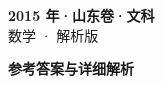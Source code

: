 \documentclass[zihao=-4, a4paper]{ctexart}
\begin{document}
\begin{center}
  {\Large\bfseries 2015 年·山东卷·文科}\\[4pt]
  {\large 数学 · 解析版}
\end{center}
\medskip
{}

\clearpage
{}
\begin{center}{\Large\bfseries 参考答案与详细解析}\end{center}
\medskip

\end{document}
